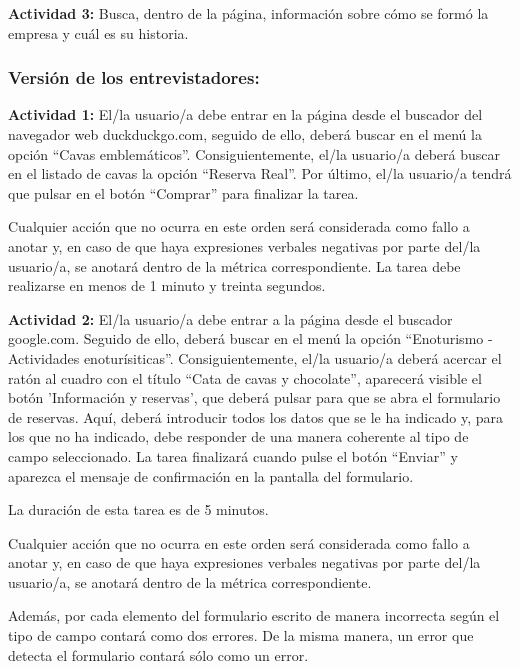 \documentclass[spanish]{article}
\begin{document}
\textbf{Actividad 3:} Busca, dentro de la página, información sobre
cómo se formó la empresa y cuál es su historia.

\subsubsection{Versión de los entrevistadores:}

\textbf{Actividad 1:} El/la usuario/a debe entrar en la
página desde el buscador del navegador web duckduckgo.com,
seguido de ello, deberá buscar en el menú la opción ``Cavas
emblemáticos''. Consiguientemente, el/la usuario/a deberá
buscar en el listado de cavas la opción ``Reserva Real''. Por
último, el/la usuario/a tendrá que pulsar en el botón
``Comprar'' para finalizar la tarea.\newline

Cualquier acción que no ocurra en este orden será
considerada como fallo a anotar y, en caso de que haya
expresiones verbales negativas por parte del/la usuario/a,
se anotará dentro de la métrica correspondiente. La tarea
debe realizarse en menos de 1 minuto y treinta
segundos.\newline

\textbf{Actividad 2:} El/la usuario/a debe entrar a la
página desde el buscador google.com.
Seguido de ello, deberá buscar en el menú la opción
``Enoturismo - Actividades enoturísiticas''.
Consiguientemente, el/la usuario/a deberá acercar el ratón
al cuadro con el título ``Cata de cavas y chocolate'',
aparecerá visible el botón 'Información y reservas', que
deberá pulsar para que se abra el formulario de reservas.
Aquí, deberá introducir todos los datos que se le ha
indicado y, para los que no ha indicado, debe responder de
una manera coherente al tipo de campo seleccionado. La tarea
finalizará cuando pulse el botón ``Enviar'' y aparezca el
mensaje de confirmación en la pantalla del
formulario.\newline

La duración de esta tarea es de 5 minutos.\newline

Cualquier acción que no ocurra en este orden será
considerada como fallo a anotar y, en caso de que haya
expresiones verbales negativas por parte del/la usuario/a,
se anotará dentro de la métrica correspondiente.\newline

Además, por cada elemento del formulario escrito de manera
incorrecta según el tipo de campo contará como dos errores. De
la misma manera, un error que detecta el formulario contará
sólo como un error.\newline
\end{document}
